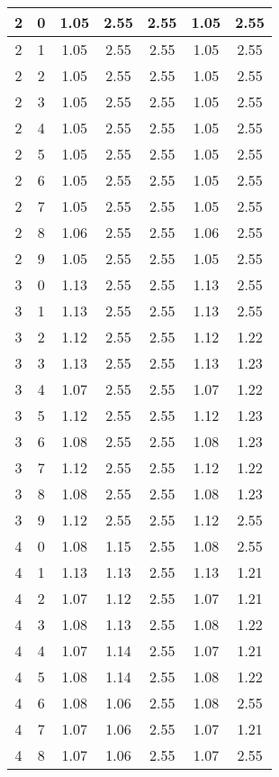 \begin{longtable}{|c|c||c||c|c||c|c|}
	2 & 0 & 1.05 & 2.55 & 2.55 & 1.05 & 2.55 \\ \hline
	2 & 1 & 1.05 & 2.55 & 2.55 & 1.05 & 2.55 \\ \hline
	2 & 2 & 1.05 & 2.55 & 2.55 & 1.05 & 2.55 \\ \hline
	2 & 3 & 1.05 & 2.55 & 2.55 & 1.05 & 2.55 \\ \hline
	2 & 4 & 1.05 & 2.55 & 2.55 & 1.05 & 2.55 \\ \hline
	2 & 5 & 1.05 & 2.55 & 2.55 & 1.05 & 2.55 \\ \hline
	2 & 6 & 1.05 & 2.55 & 2.55 & 1.05 & 2.55 \\ \hline
	2 & 7 & 1.05 & 2.55 & 2.55 & 1.05 & 2.55 \\ \hline
	2 & 8 & 1.06 & 2.55 & 2.55 & 1.06 & 2.55 \\ \hline
	2 & 9 & 1.05 & 2.55 & 2.55 & 1.05 & 2.55 \\ \hline
	3 & 0 & 1.13 & 2.55 & 2.55 & 1.13 & 2.55 \\ \hline
	3 & 1 & 1.13 & 2.55 & 2.55 & 1.13 & 2.55 \\ \hline
	3 & 2 & 1.12 & 2.55 & 2.55 & 1.12 & 1.22 \\ \hline
	3 & 3 & 1.13 & 2.55 & 2.55 & 1.13 & 1.23 \\ \hline
	3 & 4 & 1.07 & 2.55 & 2.55 & 1.07 & 1.22 \\ \hline
	3 & 5 & 1.12 & 2.55 & 2.55 & 1.12 & 1.23 \\ \hline
	3 & 6 & 1.08 & 2.55 & 2.55 & 1.08 & 1.23 \\ \hline
	3 & 7 & 1.12 & 2.55 & 2.55 & 1.12 & 1.22 \\ \hline
	3 & 8 & 1.08 & 2.55 & 2.55 & 1.08 & 1.23 \\ \hline
	3 & 9 & 1.12 & 2.55 & 2.55 & 1.12 & 2.55 \\ \hline
	4 & 0 & 1.08 & 1.15 & 2.55 & 1.08 & 2.55 \\ \hline
	4 & 1 & 1.13 & 1.13 & 2.55 & 1.13 & 1.21 \\ \hline
	4 & 2 & 1.07 & 1.12 & 2.55 & 1.07 & 1.21 \\ \hline
	4 & 3 & 1.08 & 1.13 & 2.55 & 1.08 & 1.22 \\ \hline
	4 & 4 & 1.07 & 1.14 & 2.55 & 1.07 & 1.21 \\ \hline
	4 & 5 & 1.08 & 1.14 & 2.55 & 1.08 & 1.22 \\ \hline
	4 & 6 & 1.08 & 1.06 & 2.55 & 1.08 & 2.55 \\ \hline
	4 & 7 & 1.07 & 1.06 & 2.55 & 1.07 & 1.21 \\ \hline
	4 & 8 & 1.07 & 1.06 & 2.55 & 1.07 & 2.55 \\ \hline

\end{longtable}
